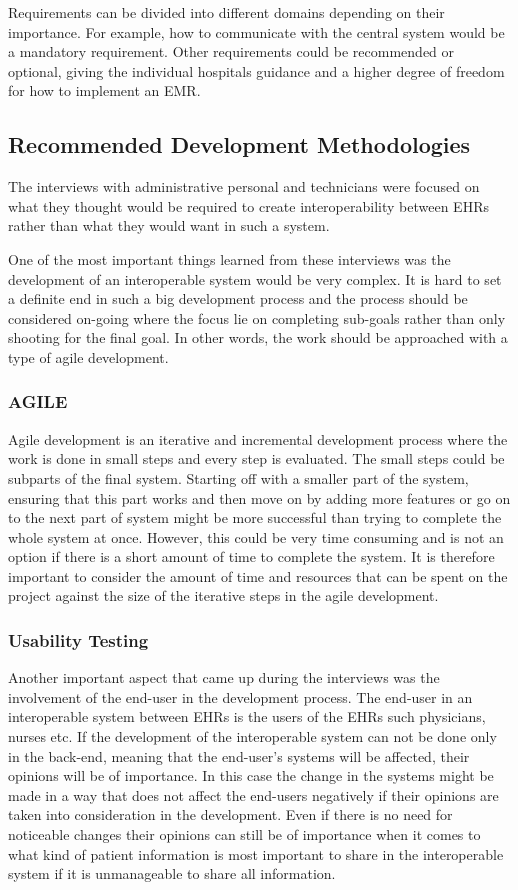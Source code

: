 \documentclass[14pt]{article}
\begin{document}
Requirements can be divided into different domains depending on their importance. For example, how to communicate with the central system would be a mandatory requirement. Other requirements could be recommended or optional, giving the individual hospitals guidance and a higher degree of freedom for how to implement an \gls{EMR}.



\subsection{Recommended Development Methodologies}
The interviews with administrative personal and technicians were focused on what they thought would be required to create interoperability between \glspl{EHR} rather than what they would want in such a system. 

One of the most important things learned from these interviews was the development of an interoperable system would be very complex. It is hard to set a definite end in such a big development process and the process should be considered on-going where the focus lie on completing sub-goals rather than only shooting for the final goal. In other words, the work should be approached with a type of agile development. 

\subsubsection{AGILE}
Agile development is an iterative and incremental development process where the work is done in small steps and every step is evaluated. The small steps could be subparts of the final system. Starting off with a smaller part of the system, ensuring that this part works and then move on by adding more features or go on to the next part of system might be more successful than trying to complete the whole system at once. However, this could be very time consuming and is not an option if there is a short amount of time to complete the system. It is therefore important to consider the amount of time and resources that can be spent on the project against the size of the iterative steps in the agile development.

\subsubsection{Usability Testing}
\label{sec:resultsUsabilityTesting}
Another important aspect that came up during the interviews was the involvement of the end-user in the development process. The end-user in an interoperable system between \glspl{EHR} is the users of the \glspl{EHR} such physicians, nurses etc. If the development of the interoperable system can not be done only in the back-end, meaning that the end-user's systems will be affected, their opinions will be of importance. In this case the change in the systems might be made in a way that does not affect the end-users negatively if their opinions are taken into consideration in the development. Even if there is no need for noticeable changes their opinions can still be of importance when it comes to what kind of patient information is most important to share in the interoperable system if it is unmanageable to share all information. 
\end{document}

